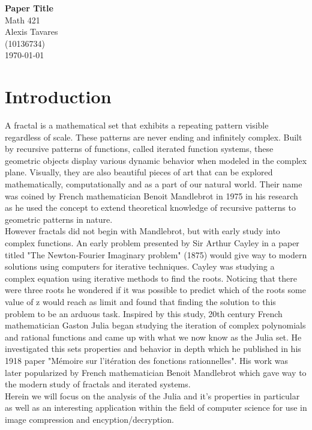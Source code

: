 \documentclass[12pt]{article}
\begin{document}
\theoremstyle{definition}
\newtheorem{exmp}{Example}[section]








\begin{titlepage}
\vfill
\centering
{\Huge \bfseries Paper Title}\\[0.4cm]
{\Huge Math 421}\\[1cm]
{\Large Alexis Tavares}\\[0.5cm]
{\Large (10136734)}\\[1cm]
\today
\vfill
\end{titlepage}

\tableofcontents
\newpage
\section{Introduction}
{\parindent0pt
A fractal is a mathematical set that exhibits a repeating pattern visible regardless of scale. These patterns are never ending and infinitely complex. Built by recursive patterns of functions, called iterated function systems, these geometric objects display various dynamic behavior when modeled in the complex plane. Visually, they are also  beautiful pieces of art that can be explored mathematically, computationally and as a part of our natural world.  Their name was coined by French mathematician Benoit Mandlebrot in 1975 in his research as he used the concept to extend theoretical knowledge of recursive patterns to geometric patterns in nature. \\

However fractals did not begin with Mandlebrot, but with early study into complex functions.  An early problem presented by Sir Arthur Cayley in a paper titled "The Newton-Fourier Imaginary problem" (1875) would give way to modern solutions using computers for iterative techniques. Cayley was studying a complex equation using iterative methods to find the roots. Noticing that there were three roots he wondered if it was possible to predict which of the roots some value of z would reach as limit and found that finding the solution to this problem to be an arduous task. Inspired by this study, 20th century French mathematician Gaston Julia began studying the iteration of complex polynomials and rational functions and came up with what we now know as the Julia set. He investigated this sets properties and behavior in depth which he published in his 1918 paper "Mémoire sur l'itération des fonctions rationnelles". His work was later popularized by French mathematician Benoit Mandlebrot which gave way to the modern study of fractals and iterated systems. \\

Herein we will focus on the analysis of the Julia and it's properties in particular as well as an interesting application within the field of computer science for use in image compression and encyption/decryption. 




}
\end{document}
